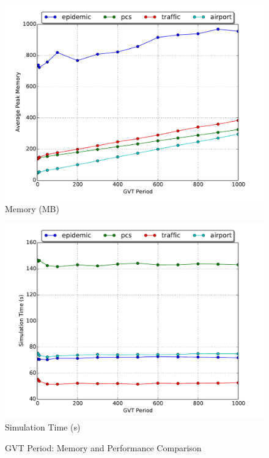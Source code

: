 \documentclass[11pt]{book}
\begin{document}
\begin{figure}
  \begin{minipage}{.5\textwidth}
    \begin{center}
      \includegraphics[width=\textwidth,keepaspectratio,quiet]{figs/fossil_collection/memory_fcw.pdf} \\
      Memory (MB) \\
    \end{center}
  \end{minipage}%
  \hfill
  \begin{minipage}{.5\textwidth}
    \begin{center}
      \includegraphics[width=\textwidth,keepaspectratio,quiet]{figs/fossil_collection/time_fcw.pdf} \\
      Simulation Time (s) \\
    \end{center}
  \end{minipage}
  \caption{GVT Period: Memory and Performance Comparison}\label{fc_memory_analysis}
\end{figure}
\end{document}
